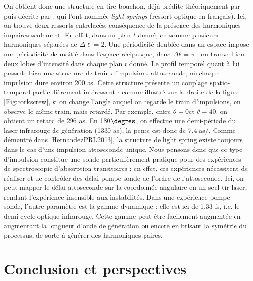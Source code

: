 On obtient donc une structure en tire-bouchon, déjà prédite théoriquement par  puis décrite par , qui l'ont nommée \textit{light springs} (ressort optique en français). Ici, on trouve deux ressorts entrelacés, conséquence de la présence des harmoniques impaires seulement. En effet, dans un plan $t$ donné, on somme plusieurs harmoniques séparées de $\Delta\ell = 2$. Une périodicité doublée dans un espace impose une périodicité de moitié dans l'espace réciproque, donc $\Delta\theta = \pi$ : on trouve bien deux lobes d'intensité dans chaque plan $t$ donné. Le profil temporel quant à lui possède bien une structure de train d'impulsions attoseconde, où chaque impulsion dure environ 200 as. Cette structure présente un couplage spatio-temporel particulièrement intéressant : comme illustré sur la droite de la figure \ref{Fig:corkscrew}, si on change l'angle auquel on regarde le train d'impulsions, on observe le même train, mais retardé. Par exemple, entre $\theta=0$\degres et $\theta=40$\degres, on obtient un retard de 296 as. En 180$\degres$, on effectue une demi-période du laser infrarouge de génération (1330 as), la pente est donc de 7.4 as/\degres. 
Comme démontré dans \ref{HernandezPRL2013}, la structure de light spring existe toujours dans le cas d'une impulsion attoseconde unique. Nous pensons donc que ce type d'impulsion constitue une sonde particulièrement pratique pour des expériences de spectroscopie d'absorption transitoires : en effet, ces expériences nécessitent de réaliser et de contrôler des délai pompe-sonde de l'ordre de l'attoseconde. Ici, on peut mapper le délai attoseconde sur la coordonnée angulaire en un seul tir laser, rendant l'expérience insensible aux instabilités. Dans une expérience pompe-sonde, l'autre paramètre est la gamme dynamique : elle est ici de 1.33 fs, i.e. le demi-cycle optique infrarouge. Cette gamme peut être facilement augmentée en augmentant la longueur d'onde de génération ou encore en brisant la symétrie du processus, de sorte à générer des harmoniques paires.

\section{Conclusion et perspectives}